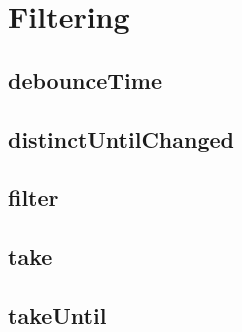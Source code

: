 \chapter{Filtering}

\section{debounceTime}

\section{distinctUntilChanged} 

\section{filter} 

\section{take} 

\section{takeUntil}